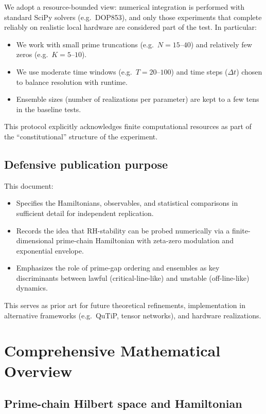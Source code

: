 \documentclass[11pt]{article}
\begin{document}
We adopt a resource-bounded view: numerical integration is performed with standard SciPy solvers (e.g.\ DOP853), and only those experiments that complete reliably on realistic local hardware are considered part of the test. In particular:
\begin{itemize}
  \item We work with small prime truncations (e.g.\ $N=15$--$40$) and relatively few zeros (e.g.\ $K=5$--$10$).
  \item We use moderate time windows (e.g.\ $T=20$--$100$) and time steps ($\Delta t$) chosen to balance resolution with runtime.
  \item Ensemble sizes (number of realizations per parameter) are kept to a few tens in the baseline tests.
\end{itemize}
This protocol explicitly acknowledges finite computational resources as part of the ``constitutional'' structure of the experiment.

\subsection{Defensive publication purpose}

This document:
\begin{itemize}
  \item Specifies the Hamiltonians, observables, and statistical comparisons in sufficient detail for independent replication.
  \item Records the idea that RH-stability can be probed numerically via a finite-dimensional prime-chain Hamiltonian with zeta-zero modulation and exponential envelope.
  \item Emphasizes the role of prime-gap ordering and ensembles as key discriminants between lawful (critical-line-like) and unstable (off-line-like) dynamics.
\end{itemize}
This serves as prior art for future theoretical refinements, implementation in alternative frameworks (e.g.\ QuTiP, tensor networks), and hardware realizations.

\section{Comprehensive Mathematical Overview}

\subsection{Prime-chain Hilbert space and Hamiltonian}
\end{document}
